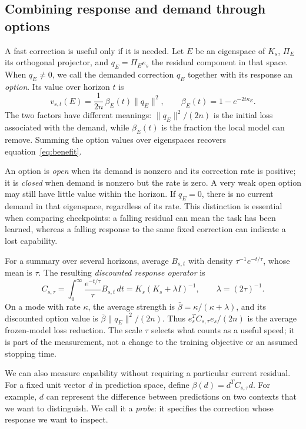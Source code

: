 \documentclass[11pt,a4paper]{article}
\begin{document}
\subsection{Combining response and demand through options}

A fast correction is useful only if it is needed. Let $E$ be an eigenspace of $K_s$, $\Pi_E$ its orthogonal projector, and $q_E=\Pi_Ee_s$ the residual component in that space. When $q_E\ne0$, we call the demanded correction $q_E$ together with its response an \emph{option}. Its value over horizon $t$ is
\begin{equation}
 v_{s,t}(E)=\frac{1}{2n}\,\beta_E(t)\|q_E\|^2,
 \qquad \beta_E(t)=1-e^{-2t\kappa_E}.
 \label{eq:option-value}
\end{equation}
The two factors have different meanings: $\|q_E\|^2/(2n)$ is the initial loss associated with the demand, while $\beta_E(t)$ is the fraction the local model can remove. Summing the option values over eigenspaces recovers equation~\eqref{eq:benefit}.

An option is \emph{open} when its demand is nonzero and its correction rate is positive; it is \emph{closed} when demand is nonzero but the rate is zero. A very weak open option may still have little value within the horizon. If $q_E=0$, there is no current demand in that eigenspace, regardless of its rate. This distinction is essential when comparing checkpoints: a falling residual can mean the task has been learned, whereas a falling response to the same fixed correction can indicate a lost capability.

For a summary over several horizons, average $B_{s,t}$ with density $\tau^{-1}e^{-t/\tau}$, whose mean is $\tau$. The resulting \emph{discounted response operator} is
\begin{equation}
 C_{s,\tau}=\int_0^\infty\frac{e^{-t/\tau}}{\tau}B_{s,t}\,dt
 =K_s(K_s+\lambda I)^{-1},\qquad \lambda=(2\tau)^{-1}.
 \label{eq:response}
\end{equation}
On a mode with rate $\kappa$, the average strength is $\bar\beta=\kappa/(\kappa+\lambda)$, and its discounted option value is $\bar\beta\|q_E\|^2/(2n)$. Thus $e_s^TC_{s,\tau}e_s/(2n)$ is the average frozen-model loss reduction. The scale $\tau$ selects what counts as a useful speed; it is part of the measurement, not a change to the training objective or an assumed stopping time.

We can also measure capability without requiring a particular current residual. For a fixed unit vector $d$ in prediction space, define $\beta(d)=d^TC_{s,\tau}d$. For example, $d$ can represent the difference between predictions on two contexts that we want to distinguish. We call it a \emph{probe}: it specifies the correction whose response we want to inspect.
\end{document}
